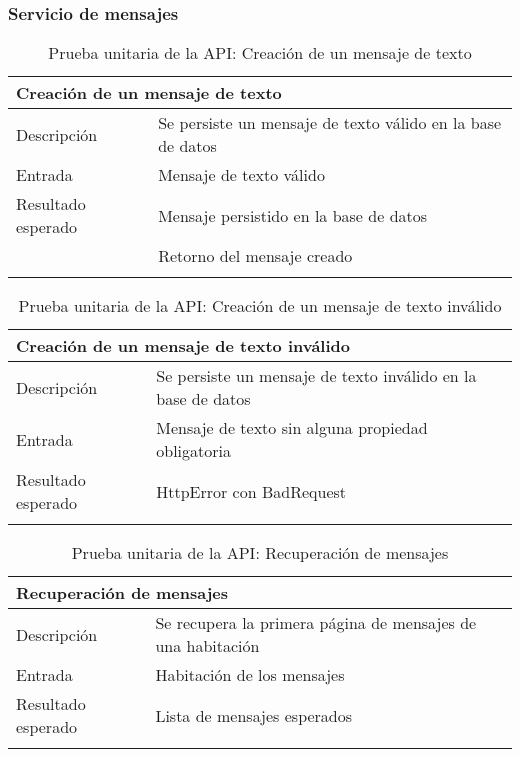 \vspace{-20pt}
\subsubsection{Servicio de mensajes}

\begin{longtable}{|p{} p{}|}
    \hline
    \multicolumn{2}{|l|}{\textbf{Creación de un mensaje de texto}} \\ \hline 
    Descripción                 & Se persiste un mensaje de texto válido en la base de datos \\ \hline
    Entrada                     & Mensaje de texto válido \\ \hline
    Resultado esperado          & Mensaje persistido en la base de datos \\
                                & Retorno del mensaje creado \\ \hline
    \caption{Prueba unitaria de la API: Creación de un mensaje de texto}
    \label{cp:u:api:crear_mensaje_texto}
\end{longtable}

\vspace{-15pt}
\begin{longtable}{|p{} p{}|}
    \hline
    \multicolumn{2}{|l|}{\textbf{Creación de un mensaje de texto inválido}} \\ \hline 
    Descripción                 & Se persiste un mensaje de texto inválido en la base de datos \\ \hline
    Entrada                     & Mensaje de texto sin alguna propiedad obligatoria \\ \hline
    Resultado esperado          & HttpError con BadRequest \\ \hline
    \caption{Prueba unitaria de la API: Creación de un mensaje de texto inválido}
    \label{cp:u:api:crear_mensaje_texto_invalido}
\end{longtable}

\begin{longtable}{|p{} p{}|}
    \hline
    \multicolumn{2}{|l|}{\textbf{Recuperación de mensajes}} \\ \hline 
    Descripción                 & Se recupera la primera página de mensajes de una habitación \\ \hline
    Entrada                     & Habitación de los mensajes \\ \hline
    Resultado esperado          & Lista de mensajes esperados \\ \hline
    \caption{Prueba unitaria de la API: Recuperación de mensajes}
    \label{cp:u:api:recuperar_mensaje}
\end{longtable}

